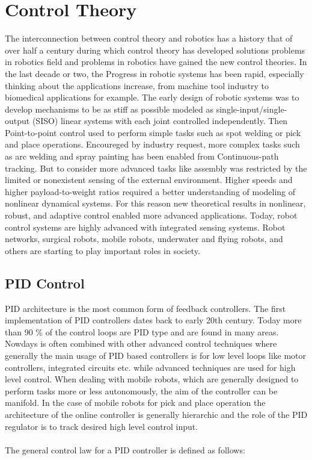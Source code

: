 \chapter{Control Theory}
\label{chapter3}

The interconnection between control theory and robotics has a history that of over half a century during which control theory has developed solutions problems in robotics field and problems in robotics have gained the new control theories. In the last decade or two, the Progress in robotic systems has been rapid, especially thinking about the applications increase, from machine tool industry to biomedical applications for example. The early design of robotic systems was to develop mechanisms to be as stiff as possible modeled as single-input/single-output (SISO) linear systems with each joint controlled independently. Then Point-to-point control used to perform simple tasks such as spot welding or pick and place operations. Encoureged by industry request, more complex tasks such as arc welding and spray painting has been enabled from Continuous-path tracking. But to consider more advanced tasks like assembly was restricted by the limited or nonexistent sensing of the external environment. Higher speeds and higher payload-to-weight ratios required a better understanding of modeling of nonlinear dynamical systems. For this reason new theoretical results in nonlinear, robust, and adaptive control enabled more advanced applications. Today, robot control systems are highly advanced with integrated sensing systems. Robot networks, surgical robots, mobile robots, underwater and flying robots, and others are starting to play important roles in society.
\section{PID Control}

PID architecture is the most common form of feedback controllers. The first implementation of PID controllers dates back to early 20th century. Today more than 90 \% of the control loops are PID type and are found in many areas. Nowdays is often combined with other advanced control techniques where generally the main usage of PID based controllers is for low level loops like motor controllers, integrated circuits etc. while advanced techniques are used for high level control.
When dealing with mobile robots, which are generally designed to perform tasks more or less autonomously, the aim of the controller can be manifold. In the case of mobile robots for pick and place operation the architecture of the online controller is generally hierarchic and the role of the PID regulator is to track desired high level control input.
\\ 
\\ The general control law for a PID controller is defined as follows: 

